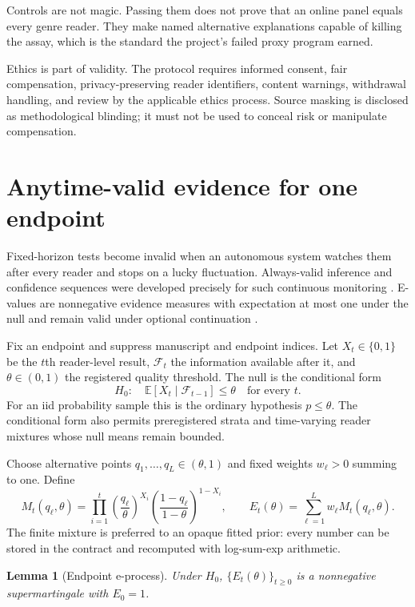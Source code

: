 \documentclass[11pt]{article}
\newtheorem{lemma}{Lemma}
\theoremstyle{remark}
\newcommand{\E}{\mathbb{E}}
\begin{document}
Controls are not magic. Passing them does not prove that an online panel equals every genre
reader. They make named alternative explanations capable of killing the assay, which is the
standard the project's failed proxy program earned.

Ethics is part of validity. The protocol requires informed consent, fair compensation,
privacy-preserving reader identifiers, content warnings, withdrawal handling, and review by
the applicable ethics process. Source masking is disclosed as methodological blinding; it
must not be used to conceal risk or manipulate compensation.

\section{Anytime-valid evidence for one endpoint}

Fixed-horizon tests become invalid when an autonomous system watches them after every reader
and stops on a lucky fluctuation. Always-valid inference and confidence sequences were
developed precisely for such continuous monitoring \cite{howard2021,johari2022}. E-values
are nonnegative evidence measures with expectation at most one under the null and remain
valid under optional continuation \cite{grunwald2024}.

Fix an endpoint and suppress manuscript and endpoint indices. Let
$X_t\in\{0,1\}$ be the $t$th reader-level result, $\mathcal F_t$ the information available
after it, and $\theta\in(0,1)$ the registered quality threshold. The null is the conditional
form
\[
 H_0:\quad \E[X_t\mid\mathcal F_{t-1}]\leq\theta
 \quad\text{for every }t.
\]
For an iid probability sample this is the ordinary hypothesis $p\leq\theta$. The conditional
form also permits preregistered strata and time-varying reader mixtures whose null means
remain bounded.

Choose alternative points $q_1,\ldots,q_L\in(\theta,1)$ and fixed weights
$w_\ell>0$ summing to one. Define
\[
 M_t(q_\ell,\theta)
 =\prod_{i=1}^{t}
   \left(\frac{q_\ell}{\theta}\right)^{X_i}
   \left(\frac{1-q_\ell}{1-\theta}\right)^{1-X_i},
 \qquad
 E_t(\theta)=\sum_{\ell=1}^{L}w_\ell M_t(q_\ell,\theta).
\]
The finite mixture is preferred to an opaque fitted prior: every number can be stored in the
contract and recomputed with log-sum-exp arithmetic.

\begin{lemma}[Endpoint e-process]
Under $H_0$, $\{E_t(\theta)\}_{t\geq0}$ is a nonnegative supermartingale with $E_0=1$.
\end{lemma}
\end{document}
